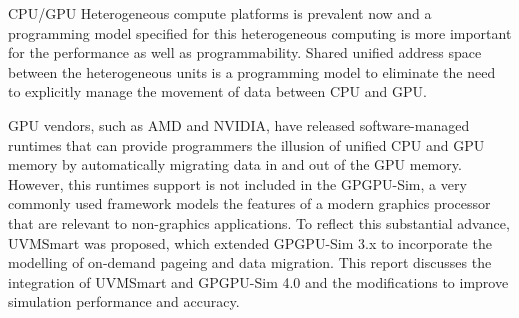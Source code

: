 CPU/GPU Heterogeneous compute platforms is prevalent now and a programming model
specified for this heterogeneous computing is more important for the 
performance as well as programmability. Shared unified address space between the 
heterogeneous units is a programming model to eliminate the need to explicitly manage 
the movement of data between CPU and GPU.

GPU vendors, such as AMD and NVIDIA, have released software-managed runtimes that can provide programmers the illusion of unified CPU and GPU memory by automatically migrating data in and out of the GPU memory. However, this runtimes support is not included in the GPGPU-Sim, a very commonly used framework models the features of a modern graphics processor that are relevant to non-graphics applications. To reflect this substantial advance, UVMSmart was proposed, which extended GPGPU-Sim 3.x to incorporate the modelling of on-demand pageing and data migration. This report 
discusses the integration of UVMSmart and GPGPU-Sim 4.0 and the modifications to 
improve simulation performance and accuracy.